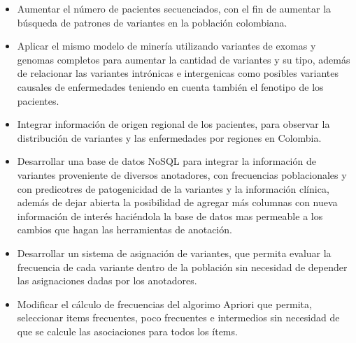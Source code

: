 \begin{itemize}
	\item Aumentar el número de pacientes secuenciados, con el fin de aumentar la búsqueda de patrones de variantes en la población colombiana.
	
	\item Aplicar el mismo modelo de minería utilizando variantes de exomas  y genomas completos para aumentar la cantidad de variantes y su tipo, además de relacionar las variantes intrónicas e intergenicas como posibles variantes causales de enfermedades teniendo en cuenta también el fenotipo de los pacientes.
	
	\item Integrar información de origen regional de los pacientes, para observar la distribución de variantes  y las enfermedades por regiones en Colombia.
	
	\item Desarrollar una base de datos NoSQL para integrar la información de variantes proveniente de diversos anotadores, con frecuencias poblacionales y con predicotres de patogenicidad de la variantes y la información clínica, además de dejar abierta la posibilidad de agregar más columnas con nueva información de interés haciéndola la base de datos mas permeable a los cambios que hagan las herramientas de anotación. 
	
	\item Desarrollar un sistema de asignación de variantes, que permita evaluar la frecuencia de cada variante dentro de la población sin necesidad de depender las asignaciones dadas por los anotadores.
	
	\item Modificar el cálculo de frecuencias del algorimo Apriori que permita, seleccionar items frecuentes, poco frecuentes e intermedios sin necesidad de que se calcule las asociaciones para todos los ítems. 

\end{itemize}
